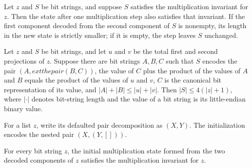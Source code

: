 \begin{theorem}
\label{Complexity.BinArith.mulInv_step}
\leanok
{}
Let $z$ and $S$ be bit strings, and suppose $S$ satisfies the multiplication invariant
for $z$. Then the state after one multiplication step also satisfies that invariant. If
the first component decoded from the second component of $S$ is nonempty, its length in
the new state is strictly smaller; if it is empty, the step leaves $S$ unchanged.
\end{theorem}

\begin{theorem}
\label{Complexity.BinArith.length_le_of_mulInv}
\leanok
{}
Let $z$ and $S$ be bit strings, and let $u$ and $v$ be the total first and second
projections of $z$. Suppose there are bit strings $A,B,C$ such that $S$ encodes the pair
$(A,	ext{the pair }(B,C))$, the value of $C$ plus the product of the values of $A$ and
$B$ equals the product of the values of $u$ and $v$, $C$ is the canonical bit
representation of its value, and $|A|+|B|\le |u|+|v|$. Then $|S|\le 4(|z|+1)$, where
$|\cdot|$ denotes bit-string length and the value of a bit string is its little-endian
binary value.
\end{theorem}

\begin{definition}
\label{Complexity.BinArith.mulInit}
\leanok
{}
For a list $z$, write its defaulted pair decomposition as $(X,Y)$. The initialization
encodes the nested pair $(X,(Y,[]))$.
\end{definition}

\begin{theorem}
\label{Complexity.BinArith.mulInv_init}
\leanok
{}
For every bit string $z$, the initial multiplication state formed from the two decoded
components of $z$ satisfies the multiplication invariant for $z$.
\end{theorem}

